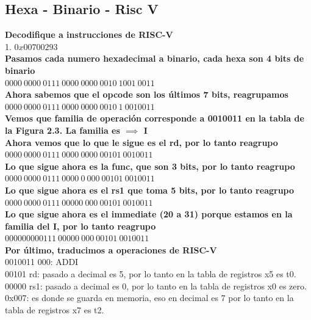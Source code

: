 \documentclass[10pt,a4paper]{article}
\begin{document}
\subsection*{Hexa - Binario - Risc V}
\textbf{Decodifique a instrucciones de RISC-V} \\
1. $0x00700293$ \\ 

\textbf{Pasamos cada numero hexadecimal a binario, cada hexa son 4 bits de binario} \\ 
$0000 \ 0000 \ 0111 \ 0000 \ 0000 \ 0010 \ 1001 \ 0011$ \\

\textbf{Ahora sabemos que el opcode son los últimos 7 bits, reagrupamos} \\ 
$0000 \ 0000 \ 0111 \ 0000 \ 0000 \ 0010 \ 1 \ 0010011$ \\

\textbf{Vemos que familia de operación corresponde a 0010011 en la tabla de la Figura 2.3. La familia es $ \implies $ I} \\
\textbf{Ahora vemos que lo que le sigue es el rd, por lo tanto reagrupo} \\
$0000 \ 0000 \ 0111 \ 0000 \ 0000 \ 00101 \ 0010011$ \\

\textbf{Lo que sigue ahora es la func, que son 3 bits, por lo tanto reagrupo} \\
$0000 \ 0000 \ 0111 \ 0000 \ 0 \ 000 \ 00101 \ 0010011$ \\

\textbf{Lo que sigue ahora es el rs1 que toma 5 bits, por lo tanto reagrupo} \\ 
$0000 \ 0000 \ 0111 \ 00000 \ 000 \ 00101 \ 0010011$ \\ 

\textbf{Lo que sigue ahora es el immediate (20 a 31) porque estamos en la familia del I, por lo tanto reagrupo} \\ 
$0000 0000 0111 \ 00000 \ 000 \ 00101 \ 0010011$ \\

\textbf{Por último, traducimos a operaciones de RISC-V} \\ 
0010011 000: ADDI  \\ 
00101 rd: pasado a decimal es 5, por lo tanto en la tabla de registros x5 es t0. \\
00000 rs1: pasado a decimal es 0, por lo tanto en la tabla de registros x0 es zero. \\
0x007: es donde se guarda en memoria, eso en decimal es 7 por lo tanto en la tabla de registros x7 es t2. \\ 
\end{document}
